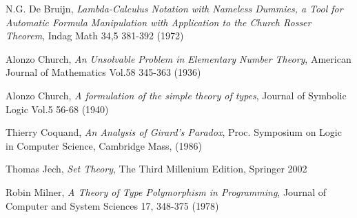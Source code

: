 \documentclass[11pt,a4paper]{article}
\begin{document}
\newpage

\newpage

\newpage

\newpage

\newpage



\begin{thebibliography}{99}

 N.G. De Bruijn, \emph{Lambda-Calculus Notation with Nameless Dummies, a Tool for Automatic Formula Manipulation with Application to the Church Rosser Theorem}, Indag Math 34,5 381-392 (1972)

 Alonzo Church, \emph{An Unsolvable Problem in Elementary Number Theory}, American Journal of Mathematics Vol.58 345-363 (1936)

 Alonzo Church, \emph{A formulation of the simple theory of types}, Journal of Symbolic Logic Vol.5 56-68 (1940)

 Thierry Coquand, \emph{An Analysis of Girard's Paradox}, Proc. Symposium on Logic in Computer Science, Cambridge Mass, (1986) 

 Thomas Jech, \emph{Set Theory}, The Third Millenium Edition, Springer 2002

 Robin Milner, \emph{A Theory of Type Polymorphism in Programming}, Journal of Computer and System Sciences 17, 348-375 (1978)

\end{thebibliography}

\end{document}
